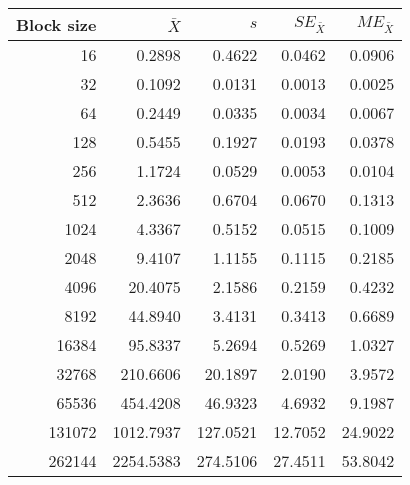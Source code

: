 \begin{tabular}{rrrrr}\toprule
{\small Block size} & $\bar{X}$ & $s$ & $SE_{\bar{X}}$ & $ME_{\bar{X}}$ \\\midrule
16 & 0.2898 & 0.4622 & 0.0462 & 0.0906\\
32 & 0.1092 & 0.0131 & 0.0013 & 0.0025\\
64 & 0.2449 & 0.0335 & 0.0034 & 0.0067\\
128 & 0.5455 & 0.1927 & 0.0193 & 0.0378\\
256 & 1.1724 & 0.0529 & 0.0053 & 0.0104\\
512 & 2.3636 & 0.6704 & 0.0670 & 0.1313\\
1024 & 4.3367 & 0.5152 & 0.0515 & 0.1009\\
2048 & 9.4107 & 1.1155 & 0.1115 & 0.2185\\
4096 & 20.4075 & 2.1586 & 0.2159 & 0.4232\\
8192 & 44.8940 & 3.4131 & 0.3413 & 0.6689\\
16384 & 95.8337 & 5.2694 & 0.5269 & 1.0327\\
32768 & 210.6606 & 20.1897 & 2.0190 & 3.9572\\
65536 & 454.4208 & 46.9323 & 4.6932 & 9.1987\\
131072 & 1012.7937 & 127.0521 & 12.7052 & 24.9022\\
262144 & 2254.5383 & 274.5106 & 27.4511 & 53.8042\\
\bottomrule
\end{tabular}
